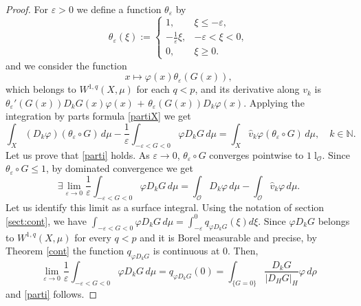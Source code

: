 \documentclass[reqno,twoside,12pt]{amsart}
\begin{document}
\begin{proof} For ${\varepsilon} >0$ we define a function $\theta_{\varepsilon}$ by 
$$\theta_{\varepsilon}(\xi) :=\left\{ \begin{array}{ll} 
1, & \xi\leq  -{\varepsilon}, 
\\
-\frac{1}{\varepsilon} \xi, &  -{\varepsilon} <\xi < 0 , 
\\
0, & \xi \geq 0 .
\end{array}\right.  $$
and we consider the function
$$ x\mapsto  \varphi(x)  \theta_{\varepsilon}(G(x)), $$
which belongs to $W^{1,q}(X, \mu)$ for each $q <p$, and its derivative along  $v_k$ is  $  \theta_{\varepsilon}'(G(x))D_k G(x)\varphi(x) $ $+$ $  \theta_{\varepsilon}(G(x))D_k \varphi(x)$. Applying the integration by parts formula \eqref{partiX} we get 
\begin{equation}
\label{prima}
\int_X (D_k\varphi)  (\theta_{\varepsilon}\circ G)  \,d\mu   -\frac{1}{\varepsilon} \int_{ -{\varepsilon}<G <0} \varphi D_k G \,d\mu =  
\int_X \hat{v}_k \varphi (  \theta_{\varepsilon}\circ G)\,d\mu, \quad k\in {\mathbb N}.
\end{equation}
Let us prove that   \eqref{parti} holds. As ${\varepsilon}\to 0$, $\theta_{\varepsilon}\circ G$ converges pointwise to  $ {1\!\!\!\;\mathrm{l}}_{\mathcal O}$. Since  $ \theta_{\varepsilon}\circ G \leq 1$, by dominated convergence we get
$$\exists   \lim_{{\varepsilon} \to 0} \frac{1}{\varepsilon} \int_{ -{\varepsilon}<G <0} \varphi D_k G \,d\mu  = \int_{\mathcal O} D_k\varphi \,d\mu -   \int_{\mathcal O} \hat{v}_k\varphi \,d\mu .$$
Let us identify this limit as a surface integral. Using the notation of section \ref{sect:cont},   we have
 $\int_{ -{\varepsilon}<G <0}  \varphi D_k G \,d\mu 
=  \int_{-{\varepsilon}}^0 q_{ \varphi D_k G}(\xi)d\xi  $. 
Since   $\varphi D_kG  $ belongs to   $W^{1,q}(X, \mu)$ for every $q<p$ and it is Borel measurable and precise, by Theorem \ref{cont} the function $q_{ \varphi D_k G}$ is continuous at $0$. Then, 
$$\lim_{{\varepsilon} \to 0}  \frac{1}{\varepsilon} \int_{ -{\varepsilon}<G <0}    \varphi D_k G \,d\mu  =   q_{ \varphi D_k G}(0)
=
\int_{\{G=0\} } \frac{D_kG}{ |D_HG|_H}  \varphi   \,d\rho $$
and \eqref{parti} follows. 


\end{proof}
\end{document}
